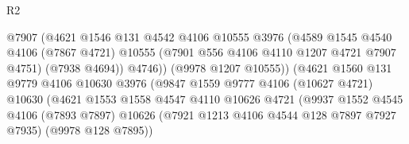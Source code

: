 \begin{lexlean}{R2}
\begin{coremodule}
                                              @7907
                                              (@4621
                                                @1546
                                                @131
                                                @4542
                                                @4106
                                                @10555
                                                @3976
                                                (@4589
                                                  @1545
                                                  @4540
                                                  @4106
                                                  (@7867 @4721)
                                                  @10555
                                                  (@7901 @556 @4106 @4110 @1207 @4721 @7907 @4751)
                                                  (@7938 @4694))
                                                @4746))
                                            (@9978 @1207 @10555))
                                          (@4621
                                            @1560
                                            @131
                                            @9779
                                            @4106
                                            @10630
                                            @3976
                                            (@9847
                                              @1559
                                              @9777
                                              @4106
                                              (@10627 @4721)
                                              @10630
                                              (@4621
                                                @1553
                                                @1558
                                                @4547
                                                @4110
                                                @10626
                                                @4721
                                                (@9937
                                                  @1552
                                                  @4545
                                                  @4106
                                                  (@7893 @7897)
                                                  @10626
                                                  (@7921 @1213 @4106 @4544 @128 @7897 @7927 @7935)
                                                  (@9978 @128 @7895))

\end{coremodule}
\end{lexlean}
